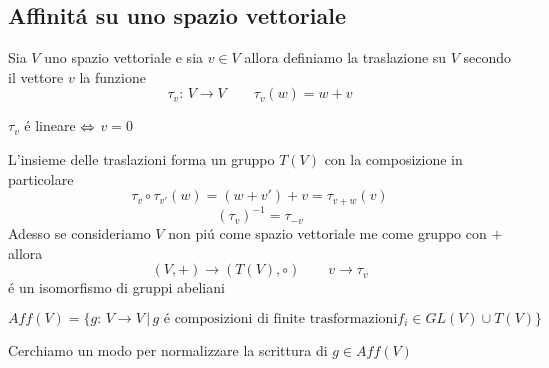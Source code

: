 \subsection{Affinit\'a su uno spazio vettoriale}
\begin{defn}[Traslazione]
Sia $V$ uno spazio vettoriale e sia $v\in V $ allora definiamo la traslazione su $V$ secondo il vettore $v$ la funzione
$$\tau_v: \, V \to V \qquad \tau_v(w)=w+v$$
\end{defn}
\begin{oss}$\tau_v $ \'e lineare $\Leftrightarrow$ $v=0$
\end{oss}
L'insieme delle traslazioni forma un gruppo $T(V)$ con la composizione in particolare 
$$ \tau_v \circ \tau_{v'}(w)=(w+v')+v = \tau_{v+w} (v)$$
$$ \left( \tau_v \right)^{-1}  = \tau_{-v}$$
\spazio
Adesso se consideriamo $V$ non pi\'u come spazio vettoriale me come gruppo con $+$ allora
$$ (V, + ) \to ( T(V), \circ ) \qquad v \to \tau_v $$
\'e un isomorfismo di gruppi abeliani
\spazio
\begin{defn}
$$ Aff(V) = \{ g :\, V \to V \, \vert \, g \text{ \'e composizioni di finite  trasformazioni} f_i \in GL(V) \cup T(V) \} $$
\end{defn}

Cerchiamo un modo per normalizzare la scrittura di $g \in Aff(V) $\\

